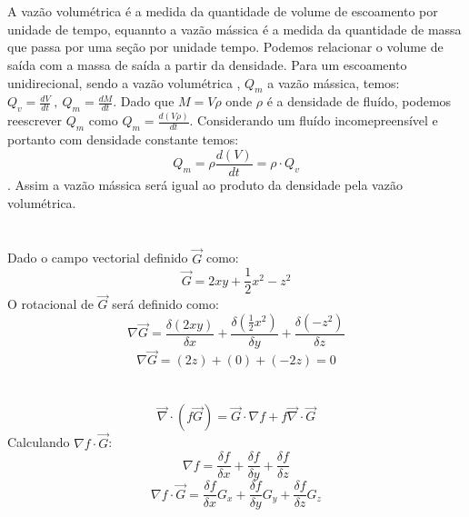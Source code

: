 \documentclass[a4paper,twocolumn,11pt]{article}
\begin{document}
\section{} %
\section{} %
\section{} %
\section{} %
A vazão volumétrica é a medida da quantidade de volume de escoamento por unidade de tempo, equannto a vazão mássica é a medida da quantidade de massa que passa por uma seção por unidade tempo. Podemos relacionar o volume de saída com a massa de saída a partir da densidade. Para um escoamento unidirecional, sendo a vazão volumétrica , $Q_m$ a vazão mássica, temos:$Q_v = \frac{d V}{dt}\ ,\ Q_m = \frac{d M}{dt}$. Dado que $M = V \rho $ onde $\rho$ é a densidade de fluído, podemos reescrever $Q_m$ como $Q_m = \frac{d (V \rho)}{dt}$. Considerando um fluído incomepreensível e portanto com densidade constante temos:
$$Q_m = \rho \frac{d (V)}{dt} = \rho\cdot Q_v$$. Assim a vazão mássica será igual ao produto da densidade pela vazão volumétrica.
\section{} %
Dado o campo vectorial definido $\vec{G}$ como:
$$\vec{G} = 2xy + \frac{1}{2}x^2 - z^2$$
O rotacional de $\vec{G}$ será definido como:
$$\nabla \vec{G} = \frac{\delta (2xy)}{\delta x} + \frac{\delta \left(\frac{1}{2}x^2\right)}{\delta y} + \frac{\delta (-z^2)}{\delta z}$$
$$\nabla \vec{G} = (2z) + (0) + (-2z) = 0$$

\section{} %
\begin{equation}\label{eq:l2q18-1}
\vec{\nabla} \cdot (f \vec{G}) =  \vec{G} \cdot \nabla f +  f \vec{\nabla} \cdot \vec{G}
\end{equation}
Calculando $\nabla f \cdot \vec{G}$:
$$
\nabla f =  \frac{\delta f}{\delta x} + \frac{\delta f}{\delta y} + \frac{\delta f}{\delta z}
$$
\begin{equation}\label{eq:l2q18-2}
\nabla f \cdot \vec{G} =  \frac{\delta f}{\delta x}G_x + \frac{\delta f}{\delta y}G_y + \frac{\delta f}{\delta z}G_z
\end{equation}
\end{document}
